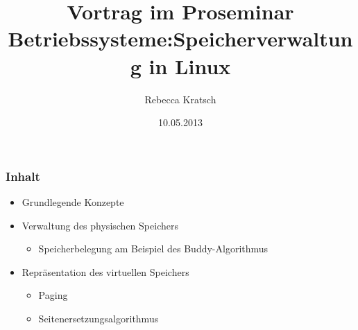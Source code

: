 \documentclass[ddcfooter]{tudbeamer}
\begin{document}
\title[Speicherverwaltung in Linux]{Vortrag im Proseminar Betriebssysteme:\vfill Speicherverwaltung in Linux}
\author{Rebecca Kratsch}

\date{10.05.2013}

\maketitle



\begin{frame}
    \frametitle{Inhalt}
    \begin{itemize}
	\item Grundlegende Konzepte
	\item Verwaltung des physischen Speichers
	\begin{itemize}
	    \item Speicherbelegung am Beispiel des Buddy-Algorithmus
	\end{itemize}
	    \item Repräsentation des virtuellen Speichers
	\begin{itemize}
	    \item Paging
	    \item Seitenersetzungsalgorithmus
	\end{itemize}
    \end{itemize}
\end{frame}
\end{document}

